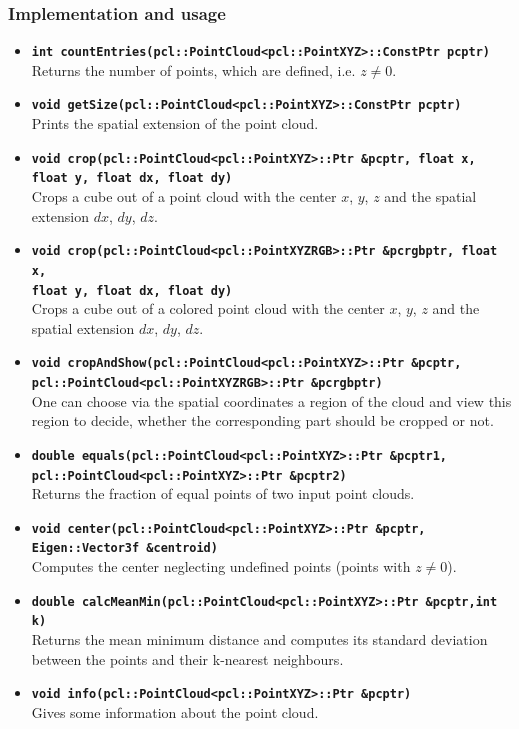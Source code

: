 \documentclass[paper=a4,11pt,bibliography=totoc]{scrartcl}
\begin{document}
\subsubsection*{\color{darkred}Implementation and usage}
%
\begin{itemize}
\item \textbf{\texttt{int countEntries(pcl::PointCloud<pcl::PointXYZ>::ConstPtr pcptr)}}\\
\textsf{Returns the number of points, which are defined, i.e. $z\neq0$.}
\item \textbf{\texttt{void getSize(pcl::PointCloud<pcl::PointXYZ>::ConstPtr pcptr)}}\\
\textsf{Prints the spatial extension of the point cloud.}
\item \textbf{\texttt{void crop(pcl::PointCloud<pcl::PointXYZ>::Ptr \&pcptr, float x, float y, float dx, float dy)}}\\
\textsf{Crops a cube out of a point cloud with the center $x$, $y$, $z$ and the spatial extension $dx$, $dy$, $dz$.}
\item \textbf{\texttt{void crop(pcl::PointCloud<pcl::PointXYZRGB>::Ptr \&pcrgbptr, float x,\\float y, float dx, float dy)}}\\
\textsf{Crops a cube out of a colored point cloud with the center $x$, $y$, $z$ and the spatial extension $dx$, $dy$, $dz$.}
\item \textbf{\texttt{void cropAndShow(pcl::PointCloud<pcl::PointXYZ>::Ptr \&pcptr,\\pcl::PointCloud<pcl::PointXYZRGB>::Ptr \&pcrgbptr)}}\\
\textsf{One can choose via the spatial coordinates a region of the cloud and view this region to decide, whether the corresponding part should be cropped or not.}
\item \textbf{\texttt{double equals(pcl::PointCloud<pcl::PointXYZ>::Ptr \&pcptr1,\\pcl::PointCloud<pcl::PointXYZ>::Ptr \&pcptr2)}}\\
\textsf{Returns the fraction of equal points of two input point clouds.}
\item \textbf{\texttt{void center(pcl::PointCloud<pcl::PointXYZ>::Ptr \&pcptr,\\Eigen::Vector3f \&centroid)}}\\
\textsf{Computes the center neglecting undefined points (points with $z\neq0$).}
\item \textbf{\texttt{double calcMeanMin(pcl::PointCloud<pcl::PointXYZ>::Ptr \&pcptr,int k)}}\\
\textsf{Returns the mean minimum distance and computes its standard deviation between the points and their k-nearest neighbours.}
\item \textbf{\texttt{void info(pcl::PointCloud<pcl::PointXYZ>::Ptr \&pcptr)}}\\
\textsf{Gives some information about the point cloud.}
\end{itemize}
%
\end{document}
